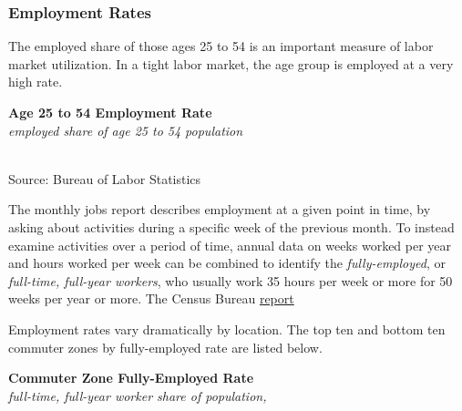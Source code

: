 \documentclass{report}
\makeatletter
\newcommand{\tbllink}[1]{\href{https://raw.githubusercontent.com/bdecon/US-chartbook/master/chartbook/data/#1}{\faTable}}
\newcommand*\short[1]{\expandafter\@gobbletwo\number\numexpr#1\relax}
\newcommand{\dateaxisticks}{
		date coordinates in=x, axis line style={draw=none},
		xmax={2022-10-31},
		max space between ticks=40,	    
		xtick={{1990-01-01}, {1992-01-01}, {1994-01-01}, 
			{1996-01-01}, {1998-01-01}, {2000-01-01}, 
			{2002-01-01}, {2004-01-01}, {2006-01-01},
			{2008-01-01}, {2010-01-01}, {2012-01-01}, {2014-01-01},
		    {2016-01-01}, {2018-01-01}, {2020-01-01}, {2022-01-01}, 
		    {2024-01-01}, {2026-01-01}},
		minor xtick={{1989-01-01}, {1991-01-01}, {1993-01-01},
			{1995-01-01}, {1997-01-01}, {1999-01-01}, 
			{2001-01-01}, {2003-01-01}, {2005-01-01}, {2007-01-01},
		    {2009-01-01}, {2011-01-01}, {2013-01-01}, {2015-01-01},
		    {2017-01-01}, {2019-01-01}, {2021-01-01}, {2023-01-01}, 
		    {2025-01-01}, {2027-01-01}},
		enlarge y limits={0.06}, enlarge x limits={0.01},
		}
\newcommand{\bbar}[2]{extra #1 ticks = {{#2}}, extra #1 tick labels = ,
		extra #1 tick style = {grid=major, grid style={thick, black!25}},}
\newcommand{\stdline}[4]{\addplot[very thick, no markers, color=#1] 
		table [x=#2, y=#3, col sep=comma] {#4};	}
\newcommand{\rbars}{
		\fill[color=black!10] (axis cs:{1990-07-01},\pgfkeysvalueof{/pgfplots/ymin}) rectangle 
			(axis cs:{1991-03-01}, \pgfkeysvalueof{/pgfplots/ymax});
		\fill[color=black!10] (axis cs:{2007-12-01},\pgfkeysvalueof{/pgfplots/ymin}) rectangle 
			(axis cs:{2009-07-01}, \pgfkeysvalueof{/pgfplots/ymax});
		\fill[color=black!10] (axis cs:{2001-03-01},\pgfkeysvalueof{/pgfplots/ymin}) rectangle 
			(axis cs:{2001-11-01}, \pgfkeysvalueof{/pgfplots/ymax});
		\fill[color=black!10] (axis cs:{2020-02-01},\pgfkeysvalueof{/pgfplots/ymin}) rectangle 
			(axis cs:{2020-05-01}, \pgfkeysvalueof{/pgfplots/ymax});}
\makeatother
\begin{document}
{\begin{minipage}{0.76\textwidth}
\subsubsection*{Employment Rates}
\vspace{-0.5mm}
\small The employed share of those ages 25 to 54 is an important measure of labor market utilization. In a tight labor market, the age group is employed at a very high rate.  

\normalsize \textbf{Age 25 to 54 Employment Rate}\\
\footnotesize{\textit{employed share of age 25 to 54 population}}\\
\hspace*{-2mm} \\
\footnotesize{Source: Bureau of Labor Statistics} \hfill \tbllink{epop.csv}
\vspace{1.5mm}

\small The monthly jobs report describes employment at a given point in time, by asking about activities during a specific week of the previous month. To instead examine activities over a period of time, annual data on weeks worked per year and hours worked per week can be combined to identify the \textit{fully-employed}, or \textit{full-time, full-year workers}, who usually work 35 hours per week or more for 50 weeks per year or more. The Census Bureau \href{https://www.census.gov/data/tables/time-series/demo/income-poverty/cps-pinc/pinc-01.html#par_textimage_14}{report} 

Employment rates vary dramatically by location. The top ten and bottom ten commuter zones by fully-employed rate are listed below.
\end{minipage}
\vspace{1mm}

\begin{minipage}{0.52\textwidth}
\normalsize \textbf{Commuter Zone Fully-Employed Rate}\\
\footnotesize{\textit{full-time, full-year worker share of population, }}\\
\vspace{1mm}


\end{minipage}}
\end{document}

